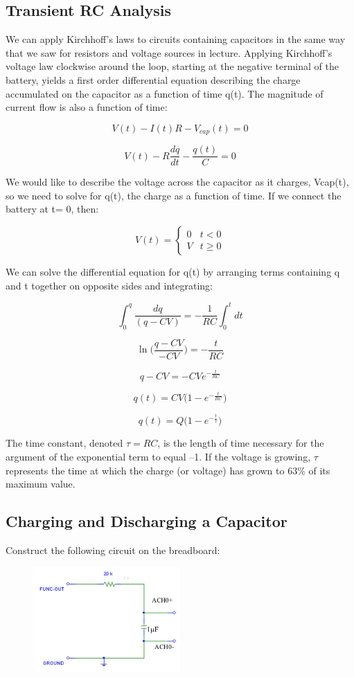 \documentclass{article}
\begin{document}
\subsection*{Transient RC Analysis}
We can apply Kirchhoff’s laws to circuits containing capacitors in the same way that we saw for resistors and voltage sources in lecture. Applying Kirchhoff’s voltage law clockwise around the loop, starting at the negative terminal of the battery, yields a first order differential equation describing the charge accumulated on the capacitor as a function of time q(t). The magnitude of current flow is also a function of time:

$$V(t) - I(t)R - V_{cap}(t) = 0$$

$$V(t) - R\frac{dq}{dt} - \frac{q(t)}{C} = 0$$

We would like to describe the voltage across the capacitor as it charges, Vcap(t), so we need to solve for q(t), the charge as a function of time. If we connect the battery at t= 0, then:

$$V(t) = \begin{cases} 0 & t < 0 \\V & t \geq 0 \end{cases}$$

We can solve the differential equation for q(t) by arranging terms containing q and t together on opposite sides and integrating:

$$\int^q_0\frac{dq}{(q-CV)} = -\frac{1}{RC}\int^t_0 dt$$

$$\ln{\Big(\frac{q-CV}{-CV}\Big)} = -\frac{t}{RC}$$

$$q-CV = -CVe^{-\frac{t}{RC}}$$

$$q(t) = CV\Big(1-e^{-\frac{t}{RC}}\Big)$$

$$q(t) = Q\Big(1-e^{-\frac{t}{\tau}}\Big)$$

The time constant, denoted $\tau = RC$, is the length of time necessary for the argument of the exponential term to equal –1. If the voltage is growing, $\tau$ represents the time at which the charge (or voltage) has grown to 63\% of its maximum value.

\subsection*{Charging and Discharging a Capacitor}
Construct the following circuit on the breadboard:

\begin{figure}[h]
    	\includegraphics[width=0.5\textwidth]{lab_1_fig_2.jpg}
    	\centering
		\end{figure}
\end{document}
